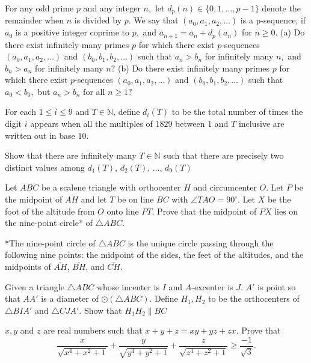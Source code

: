 \documentclass[11pt]{scrartcl}
\begin{document}
\begin{problem}[522990139281725]
	For any odd prime $p$ and any integer $n,$ let $d_p (n) \in \{ 0,1, \dots, p-1 \}$ denote the remainder when $n$ is divided by $p.$ We say that $(a_0, a_1, a_2, \dots)$ is a p-sequence, if $a_0$ is a positive integer coprime to $p,$ and $a_{n+1} =a_n + d_p (a_n)$ for $n \geqslant 0.$
(a) Do there exist infinitely many primes $p$ for which there exist $p$-sequences $(a_0, a_1, a_2, \dots)$ and $(b_0, b_1, b_2, \dots)$ such that $a_n >b_n$ for infinitely many $n,$ and $b_n > a_n$ for infinitely many $n?$
(b) Do there exist infinitely many primes $p$ for which there exist $p$-sequences $(a_0, a_1, a_2, \dots)$ and $(b_0, b_1, b_2, \dots)$ such that $a_0 <b_0,$ but $a_n >b_n$ for all $n \geqslant 1?$
\end{problem}
\begin{problem}[526922799283626]
	For each $1\leq i\leq 9$ and $T\in\mathbb N$, define $d_i(T)$ to be the total number of times the digit $i$ appears when all the multiples of $1829$ between $1$ and $T$ inclusive are written out in base $10$.

Show that there are infinitely many $T\in\mathbb N$ such that there are precisely two distinct values among $d_1(T)$, $d_2(T)$, $\dots$, $d_9(T)$
\end{problem}
\begin{problem}[528087142744727]
	Let $ABC$ be a scalene triangle with orthocenter $H$ and circumcenter $O$. Let $P$ be the midpoint of $\overline{AH}$ and let $T$ be on line $BC$ with $\angle TAO=90^{\circ}$. Let $X$ be the foot of the altitude from $O$ onto line $PT$. Prove that the midpoint of $\overline{PX}$ lies on the nine-point circle* of $\triangle ABC$.

*The nine-point circle of $\triangle ABC$ is the unique circle passing through the following nine points: the midpoint of the sides, the feet of the altitudes, and the midpoints of $\overline{AH}$, $\overline{BH}$, and $\overline{CH}$.
\end{problem}
\begin{problem}[528504335909385]
Given a triangle $ \triangle{ABC} $ whose incenter is $ I $ and $ A $-excenter is $ J $. $ A' $ is point so that $ AA' $ is a diameter of $ \odot\left(\triangle{ABC}\right) $. Define $ H_{1}, H_{2} $ to be the orthocenters of $ \triangle{BIA'} $ and $ \triangle{CJA'} $. Show that $ H_{1}H_{2} \parallel BC $
\end{problem}
\begin{problem}[530972846000695]
	$x,y$ and $z$ are real numbers such that $x+y+z=xy+yz+zx$. Prove that
$$\frac{x}{\sqrt{x^4+x^2+1}}+\frac{y}{\sqrt{y^4+y^2+1}}+\frac{z}{\sqrt{z^4+z^2+1}}\geq \frac{-1}{\sqrt{3}}.$$
\end{problem}
\end{document}
